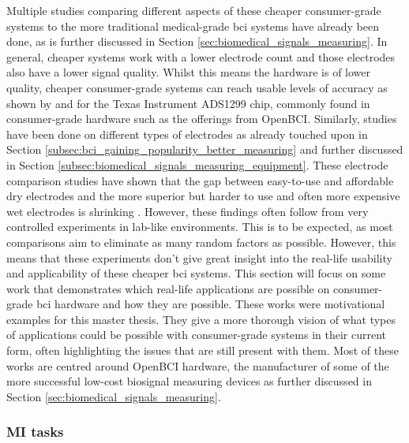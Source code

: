 Multiple studies comparing different aspects of these cheaper consumer-grade systems to the more traditional medical-grade \gls{bci} systems have already been done, as is further discussed in Section \ref{sec:biomedical_signals_measuring}.
In general, cheaper systems work with a lower electrode count and those electrodes also have a lower signal quality.
Whilst this means the hardware is of lower quality, cheaper consumer-grade systems can reach usable levels of accuracy as shown by \citet{openbci_vs_medical} and \citet{openbci_eeg_sensor_evaluation} for the Texas Instrument ADS1299 chip, commonly found in consumer-grade hardware such as the offerings from OpenBCI.
Similarly, studies have been done on different types of electrodes as already touched upon in Section \ref{subsec:bci_gaining_popularity_better_measuring} and further discussed in Section \ref{subsec:biomedical_signals_measuring_equipment}.
These electrode comparison studies have shown that the gap between easy-to-use and affordable dry electrodes and the more superior but harder to use and often more expensive wet electrodes is shrinking \citep{wet_vs_dry, dry_electrode_status, wet_dry_comparison_experiment}.
However, these findings often follow from very controlled experiments in lab-like environments.
This is to be expected, as most comparisons aim to eliminate as many random factors as possible.
However, this means that these experiments don't give great insight into the real-life usability and applicability of these cheaper \gls{bci} systems.
This section will focus on some work that demonstrates which real-life applications are possible on consumer-grade \gls{bci} hardware and how they are possible.
These works were motivational examples for this master thesis.
They give a more thorough vision of what types of applications could be possible with consumer-grade systems in their current form, often highlighting the issues that are still present with them.
Most of these works are centred around OpenBCI hardware, the manufacturer of some of the more successful low-cost \gls{biosignal} measuring devices as further discussed in Section \ref{sec:biomedical_signals_measuring}.




\subsubsection{MI tasks}
\label{subsubsec:bci_opportunities_obstacles_motivating_mi_tasks}

